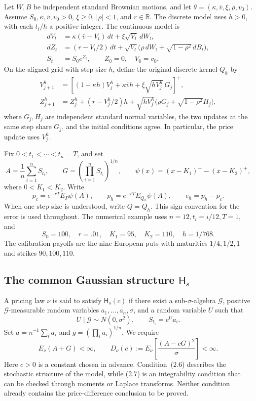 \documentclass[11pt,a4paper]{article}
\begin{document}
Let \(W,B\) be independent standard Brownian motions, and let
\(\theta=(\kappa,\bar v,\xi,\rho,v_0)\).
Assume
\(S_0,\kappa,\bar v,v_0>0\), \(\xi\ge0\), \(|\rho|<1\), and \(r\in\mathbb R\).
The discrete model uses \(h>0\), with each \(t_i/h\) a positive integer. The continuous model is
\[
\begin{aligned}
dV_t&=\kappa(\bar v-V_t)\,dt+\xi\sqrt{V_t}\,dW_t,\\
dZ_t&=(r-V_t/2)\,dt+
\sqrt{V_t}\bigl(\rho\,dW_t+\sqrt{1-\rho^2}\,dB_t\bigr),\\
S_t&=S_0e^{Z_t},\qquad Z_0=0,\quad V_0=v_0.
\end{aligned}
\tag{2.1}
\]
On the aligned grid with step size \(h\), define the original discrete kernel \(Q_h\) by
\[
\begin{aligned}
V_{j+1}^h&=\left[(1-\kappa h)V_j^h+\kappa\bar v h+
\xi\sqrt{hV_j^h}\,G_j\right]^+,\\
Z_{j+1}^h&=Z_j^h+(r-V_j^h/2)h+
\sqrt{hV_j^h}\bigl(\rho G_j+\sqrt{1-\rho^2}H_j\bigr),
\end{aligned}
\tag{2.2}
\]
where \(G_j,H_j\) are independent standard normal variables, the two updates at the same step share \(G_j\), and the initial conditions agree. In particular, the price update uses \(V_j^h\).

Fix \(0<t_1<\cdots<t_n=T\), and set
\[
A=\frac1n\sum_{i=1}^nS_{t_i},\qquad
G=\left(\prod_{i=1}^nS_{t_i}\right)^{1/n},\qquad
\psi(x)=(x-K_1)^+-(x-K_2)^+,
\tag{2.3}
\]
where \(0<K_1<K_2\). Write
\[
p_c=e^{-rT}E_P\psi(A),\qquad
p_h=e^{-rT}E_{Q_h}\psi(A),\qquad e_h=p_h-p_c.
\tag{2.4}
\]
When one step size is understood, write \(Q=Q_h\). This sign convention for the error is used throughout. The numerical example uses \(n=12,t_i=i/12,T=1\), and
\[
S_0=100,\quad r=.01,\quad K_1=95,\quad K_2=110,\quad h=1/768.
\tag{2.5}
\]
The calibration payoffs are the nine European puts with maturities \(1/4,1/2,1\) and strikes \(90,100,110\).

\subsection{The common Gaussian structure \(\mathsf H_s\)}

A pricing law \(\nu\) is said to satisfy \(\mathsf H_s(c)\) if there exist a sub-\(\sigma\)-algebra \(\mathcal G\), positive \(\mathcal G\)-measurable random variables \(a_1,\ldots,a_n,\sigma\), and a random variable \(U\) such that
\[
U\mid\mathcal G\sim N(0,\sigma^2),\qquad S_{t_i}=e^Ua_i.
\tag{2.6}
\]
Set \(a=n^{-1}\sum_i a_i\) and \(g=(\prod_i a_i)^{1/n}\). We require
\[
E_\nu(A+G)<\infty,\qquad
D_\nu(c):=E_\nu\!\left[\frac{(A-cG)^2}{\sigma}\right]<\infty.
\tag{2.7}
\]
Here \(c>0\) is a constant chosen in advance. Condition~(2.6) describes the stochastic structure of the model, while (2.7) is an integrability condition that can be checked through moments or Laplace transforms. Neither condition already contains the price-difference conclusion to be proved.
\end{document}
